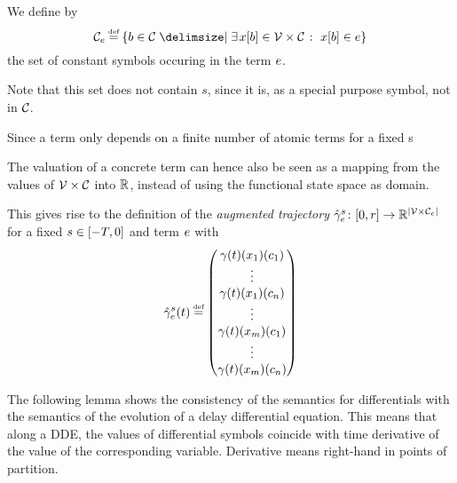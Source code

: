     \begin{definition}\label{def:termvars}
        We define by
        \begin{equation*}
            \constants[\astrm] \defeq \set{b\in\constants \with \mexists{\x[b]\in\delayvars}\holds\x[b]\in\astrm}
        \end{equation*}
        the set of constant symbols occuring in the term $\astrm$.

        Note that this set does not contain $s$, since it is, as a special purpose symbol, not in $\constants$.
    \end{definition}

    \begin{definition}\label{def:aug-trajectory}
        Since a term only depends on a finite number of atomic terms for a fixed s
        
        The valuation of a concrete term can hence also be seen as a mapping from the values of $\delayvars$
        into $\R$, instead of using the functional state space as domain.

        This gives rise to the definition of the \emph{augmented trajectory} $\augtrajectory[s]{\astrm}\from\compactum{0}{r}\to\R^{\abs{\delayvars[\astrm]}}$ for a fixed $s\in\closeddelayinterval$ and term $\astrm$ with
        \begin{equation*}
            \augtrajectory[s]{\astrm}(t) \defeq \colvec{\trajectory(t)(x_1)(c_1)\\ \vdots\\ \trajectory(t)(x_1)(c_n)\\ \vdots\\ \trajectory(t)(x_m)(c_1)\\ \vdots\\ \trajectory(t)(x_m)(c_n)}
        \end{equation*}
    \end{definition}

    The following lemma shows the consistency of the semantics for differentials with the semantics of the evolution of a delay differential equation.
    This means that along a DDE, the values of differential symbols coincide with time derivative of the value of the corresponding variable.
    Derivative means right-hand in points of partition.

